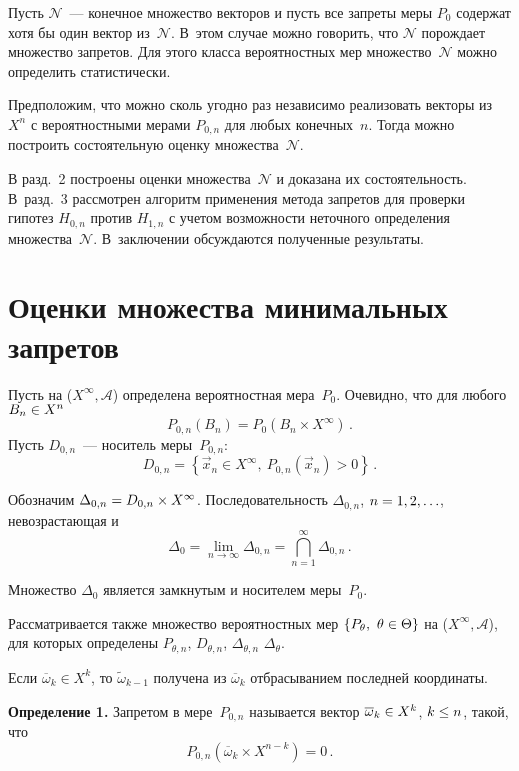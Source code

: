 \begin{multicols}{2}
  Пусть $\mathcal{N}$~--- конечное множество векторов и пусть все запреты меры 
$P_0$ содержат хотя бы один вектор из~$\mathcal{N}$. В~этом случае можно 
говорить, что $\mathcal{N}$ порождает множество запретов. Для этого класса 
вероятностных мер множество~$\mathcal{N}$ можно определить статистически. 
  
  Предположим, что можно сколь угодно раз независимо реализовать векторы 
из $X^n$ с вероятностными мерами $P_{0,n}$ для любых конечных~$n$. Тогда 
можно построить состоятельную оценку множества~$\mathcal{N}$. 
  
  В разд.~2 построены оценки множества~$\mathcal{N}$ и доказана их 
состоятельность. В~разд.~3 рассмотрен алгоритм применения метода запретов 
для проверки гипотез $H_{0,n}$ против $H_{1,n}$ с учетом возможности 
неточного определения множества~$\mathcal{N}$. В~заключении обсуждаются 
полученные результаты.

\section{Оценки множества минимальных запретов}

  Пусть на ($X^\infty, \mathcal{A}$) определена вероятностная мера~$P_0$. 
Очевидно, что для любого $B_n\hm\in X^n$
  $$ 
  P_{0,n}(B_n)=P_0\left( B_n\times X^\infty\right)\,.$$
  Пусть $D_{0,n}$~--- носитель меры~$P_{0,n}$:
  $$
  D_{0,n}=\left\{ \vec{x}_n\in X^\infty,\ P_{0,n}\left( \vec{x}_n\right)>0\right\}\,.
  $$
  
  Обозначим $\Delta_{0,n}\hm=D_{0,n}\times X^\infty$. Последовательность 
$\Delta_{0,n}$, $n\hm=1,2,\ldots$, невозрастающая и 
  $$
  \Delta_0 =\lim\limits_{n\rightarrow \infty} \Delta_{0,n}=\mathop{\bigcap}\limits_{n=1}^\infty 
\Delta_{0,n}\,.
  $$
  
  Множество $\Delta_0$ является замкнутым и носителем меры~$P_0$.
  
  Рассматривается также множество вероятностных мер $\left\{ P_\theta,\ 
\theta\hm\in\Theta\right\}$ на ($X^\infty, \mathcal{A}$), для которых определены 
$P_{\theta,n}$, $D_{\theta,n}$, $\Delta_{\theta,n}$ $\Delta_\theta$.
  
  Если $\overline{\omega}_k\in X^k$, то $\tilde{\omega}_{k-1}$ получена из 
$\overline{\omega}_k$ отбрасыванием последней координаты.
  
  \smallskip
  
  \noindent
  \textbf{Определение 1.} Запретом в мере~$P_{0,n}$ называется вектор 
$\overline{\omega}_k\hm\in X^k$, $k\hm\leq n$, такой, что 
  $$
  P_{0,n}\left( \overline{\omega}_k\times X^{n-k}\right)=0\,.
  $$
  

\end{multicols}
